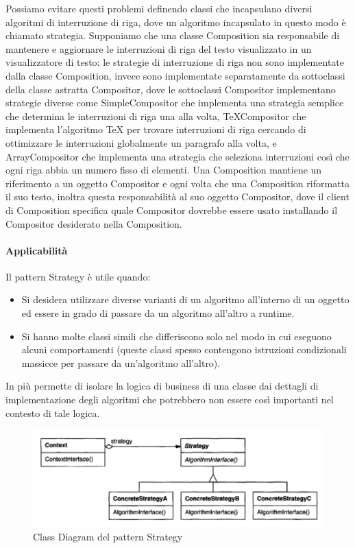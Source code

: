 Possiamo evitare questi problemi definendo classi che incapsulano diversi algoritmi di interruzione di riga, dove un algoritmo incapsulato in questo modo è chiamato strategia. Supponiamo che una classe Composition sia responsabile di mantenere e aggiornare le interruzioni di riga del testo visualizzato in un visualizzatore di testo: le strategie di interruzione di riga non sono implementate dalla classe Composition, invece sono implementate separatamente da sottoclassi della classe astratta Compositor, dove le sottoclassi Compositor implementano strategie diverse come SimpleCompositor che implementa una strategia semplice che determina le interruzioni di riga una alla volta, TeXCompositor che implementa l'algoritmo TeX per trovare interruzioni di riga cercando di ottimizzare le interruzioni globalmente un paragrafo alla volta, e ArrayCompositor che implementa una strategia che seleziona interruzioni così che ogni riga abbia un numero fisso di elementi. Una Composition mantiene un riferimento a un oggetto Compositor e ogni volta che una Composition riformatta il suo testo, inoltra questa responsabilità al suo oggetto Compositor, dove il client di Composition specifica quale Compositor dovrebbe essere usato installando il Compositor desiderato nella Composition. 

\newpage

\paragraph{Applicabilità} Il pattern Strategy è utile quando:

\begin{itemize}
    \item Si desidera utilizzare diverse varianti di un algoritmo all'interno di un oggetto ed essere in grado di passare da un algoritmo all'altro a runtime.
    \item Si hanno molte classi simili che differiscono solo nel modo in cui eseguono alcuni comportamenti (queste classi spesso contengono istruzioni condizionali massicce per passare da un'algoritmo all'altro).
\end{itemize}

In più permette di isolare la logica di business di una classe dai dettagli di implementazione degli algoritmi che potrebbero non essere così importanti nel contesto di tale logica.

\begin{figure}[H]
    \centering
    \includegraphics[width=0.75\linewidth]{assets/pattern/strategy/strategy-struttura.png}
    \caption{Class Diagram del pattern Strategy}
\end{figure}

